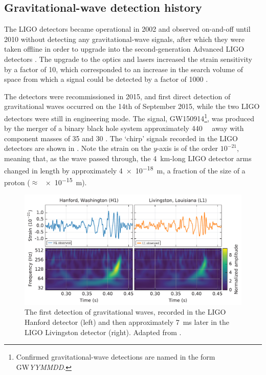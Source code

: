 \subsection{Gravitational-wave detection history}
\label{sec:gw_detections}
\begin{colsection}

The LIGO detectors became operational in 2002 and observed on-and-off until 2010 without detecting any gravitational-wave signals, after which they were taken offline in order to upgrade into the second-generation Advanced LIGO detectors \citep{LIGO_initial, LIGO_advanced}. The upgrade to the optics and lasers increased the strain sensitivity by a factor of 10, which corresponded to an increase in the search volume of space from which a signal could be detected by a factor of 1000 \citep{LIGO}.

The detectors were recommissioned in 2015, and first direct detection of gravitational waves occurred on the 14th of September 2015, while the two LIGO detectors were still in engineering mode. The signal, GW150914\footnote{Confirmed gravitational-wave detections are named in the form GW\textit{YYMMDD}.}, was produced by the merger of a binary black hole system approximately \SI{440}{\mega\parsec} away with component masses of \SI{35}{\solarmass} and \SI{30}{\solarmass} \citep{GW150914}. The `chirp' signals recorded in the LIGO detectors are shown in . Note the strain on the $y$-axis is of the order $10^{-21}$, meaning that, as the wave passed through, the \SI{4}{\kilo\metre}-long LIGO detector arms changed in length by approximately \SI{4e-18}{\metre}, a fraction of the size of a proton ($\approx$ \SI{e-15}{\metre}).

\begin{figure}[t]
    \begin{center}
        \includegraphics[width=\linewidth]{images/chirp2.pdf}
    \end{center}
    \caption[The first detection of gravitational waves]{
        The first detection of gravitational waves, recorded in the LIGO Hanford detector (left) and then approximately \SI{7}{\milli\second} later in the LIGO Livingston detector (right). Adapted from \citet{GW150914}.
        }\label{fig:chirp}
\end{figure}


\end{colsection}
